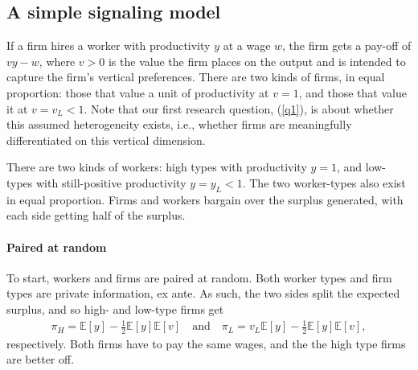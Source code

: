 \subsection{A simple signaling model}
If a firm hires a worker with productivity $y$ at a wage $w$, the firm gets a pay-off of $vy - w$, where $v > 0$ is the value the firm places on the output and is intended to capture the firm's vertical preferences.
There are two kinds of firms, in equal proportion: those that value a unit of productivity at $v = 1$, and those that value it at $v = v_L < 1$.
Note that our first research question, (\ref{q1}), is about whether this assumed heterogeneity exists, i.e., whether firms are meaningfully differentiated on this vertical dimension.

There are two kinds of workers: high types with productivity $y = 1$, and low-types with still-positive productivity $y = y_L < 1$.
The two worker-types also exist in equal proportion. 
Firms and workers bargain over the surplus generated, with each side getting half of the surplus. 

\paragraph{Paired at random}
To start, workers and firms are paired at random.
Both worker types and firm types are private information, ex ante.
As such, the two sides split the expected surplus, and so high- and low-type firms get 
\begin{align} \label{eq:pooling}
  \pi_H  = \mathbb{E}[y] - \frac{1}{2}\mathbb{E}[y]\mathbb{E}[v] \quad \mbox{and} \quad \pi_L  = v_L \mathbb{E}[y] - \frac{1}{2}\mathbb{E}[y]\mathbb{E}[v], \nonumber
\end{align}
respectively. 
Both firms have to pay the same wages, and the the high type firms are better off. 

